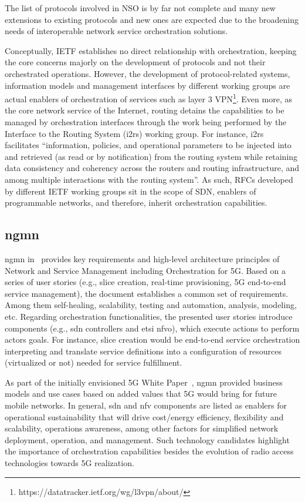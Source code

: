 The list of protocols involved in NSO is by far not complete and many new extensions to existing protocols and new ones are expected due to the broadening needs of interoperable network service orchestration solutions.


Conceptually, IETF establishes no direct relationship with orchestration, keeping the core concerns majorly on the development of protocols and not their orchestrated operations. However, the development of protocol-related systems, information models and management interfaces by different working groups are actual enablers of  orchestration of services such as layer 3 VPN\footnote{https://datatracker.ietf.org/wg/l3vpn/about/}.
Even more, as the core network service of the Internet, routing detains the capabilities to be managed by orchestration interfaces through the work being performed by the Interface to the Routing System (i2rs) working group.  
For instance, i2rs facilitates ``information, policies, and operational parameters to be injected into and retrieved (as read or by notification) from the routing system while retaining data consistency and coherency across the routers and routing infrastructure, and among multiple interactions with the routing system''.
As such, RFCs developed by different IETF working groups
sit in the scope of SDN, enablers of programmable networks, and therefore, inherit orchestration capabilities.


\subsection{\acrfull{ngmn}}
\gls{ngmn} in~\cite{NGMN:5G:2017} provides key requirements and high-level architecture principles of Network and Service Management including Orchestration for 5G. Based on a series of user stories (e.g., slice creation, real-time provisioning, 5G end-to-end service management), the document establishes a common set of requirements. Among them self-healing, scalability, testing and automation, analysis, modeling, etc. Regarding orchestration functionalities, the presented user stories introduce components (e.g., \gls{sdn} controllers and \gls{etsi} \gls{nfvo}), which execute actions to perform actors goals. For instance, slice creation would be end-to-end service orchestration interpreting and translate service definitions into a configuration of resources (virtualized or not) needed for service fulfillment.  

As part of the initially envisioned 5G White Paper~\cite{NGMNAlliance20155GPaper}, \gls{ngmn} provided business models and use cases based on added values that 5G would bring for future mobile networks. In general, \gls{sdn} and \gls{nfv} components are listed as enablers for operational sustainability that will drive cost/energy efficiency, flexibility and scalability, operations awareness, among other factors for simplified network deployment, operation, and management. Such technology candidates highlight the importance of orchestration capabilities besides the evolution of radio access technologies towards 5G realization.


